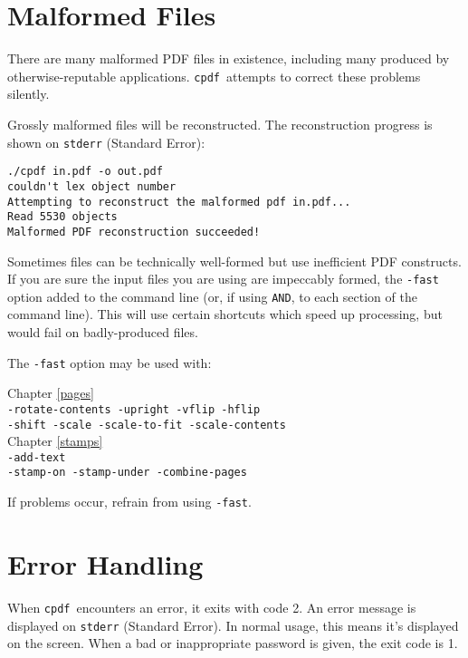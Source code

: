 \documentclass{book}
\newcommand{\cpdf}{\texttt{cpdf}}
\begin{document}
\section{Malformed Files}

There are many malformed PDF files in existence, including many produced by
otherwise-reputable applications. \cpdf\ attempts to correct these problems
silently.

Grossly malformed files will be reconstructed. The reconstruction
progress is shown on \verb!stderr! (Standard Error):

\begin{framed}
\noindent\small\verb!./cpdf in.pdf -o out.pdf!\\
\small\verb!couldn't lex object number!\\
\small\verb!Attempting to reconstruct the malformed pdf in.pdf...!\\
\small\verb!Read 5530 objects!\\
\small\verb$Malformed PDF reconstruction succeeded!$
\end{framed}

\noindent Sometimes files can be technically well-formed but use inefficient PDF
constructs.  If you are sure the input files you are using are
impeccably formed, the \texttt{-fast} option added to the command line (or, if
using \texttt{AND}, to each section of the command line). This will use certain
shortcuts which speed up processing, but would fail on badly-produced files.

The \verb!-fast! option may be used with:

\begin{framed}
\small\noindent Chapter \ref{pages}\\
\noindent\small\verb!-rotate-contents -upright -vflip -hflip!\\
\small\verb!-shift -scale -scale-to-fit -scale-contents!\\

\noindent Chapter \ref{stamps}\\
\noindent\small\verb!-add-text!\\
\small\verb!-stamp-on -stamp-under -combine-pages!
\end{framed}

\noindent If problems occur, refrain from using \verb!-fast!.

\section{Error Handling}
When \cpdf\ encounters an error, it exits with code 2. An error message is
displayed on \texttt{stderr} (Standard Error). In normal usage, this means it's
displayed on the screen. When a bad or inappropriate password is given, the exit code is 1.
\end{document}
